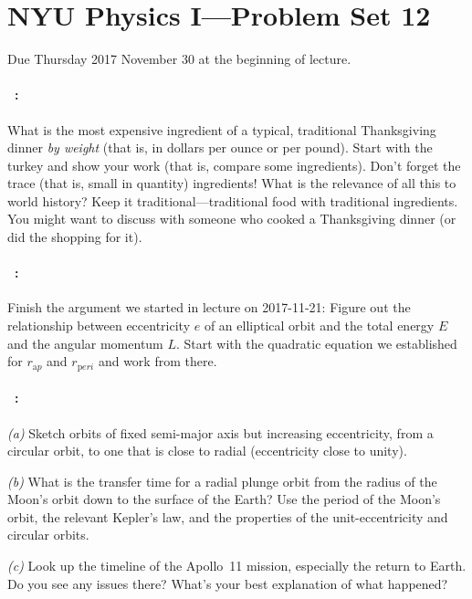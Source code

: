 \documentclass[12pt]{article}
\begin{document}
\section*{NYU Physics I---Problem Set 12}

Due Thursday 2017 November 30 at the beginning of lecture.

\paragraph{\problemname~\theproblem:}%
What is the most expensive ingredient of a typical, traditional
Thanksgiving dinner \emph{by weight} (that is, in dollars per ounce or
per pound).  Start with the turkey and show your work (that is,
compare some ingredients). Don't forget the trace (that is, small
in quantity) ingredients!
What is the relevance of all this to world
history? Keep it traditional---traditional food with traditional
ingredients. You might want to discuss with someone who cooked
a Thanksgiving dinner (or did the shopping for it).

\paragraph{\problemname~\theproblem:}%
Finish the argument we started in lecture on 2017-11-21: Figure out
the relationship between eccentricity $e$ of an elliptical orbit and
the total energy $E$ and the angular momentum $L$. Start with the
quadratic equation we established for $r_{\mathrm ap}$ and $r_{\mathrm
  peri}$ and work from there.

\paragraph{\problemname~\theproblem:}%
\textsl{(a)}
Sketch orbits of fixed semi-major axis but increasing
eccentricity, from a circular orbit, to one that is close to radial
(eccentricity close to unity).

\textsl{(b)}
What is the transfer time for a radial plunge orbit
from the radius of the Moon's orbit down to the surface of the Earth?
Use the period of the Moon's orbit, the relevant  Kepler's law, and
the properties of the unit-eccentricity and circular orbits.

\textsl{(c)}
Look up the timeline of the Apollo~11 mission, especially
the return to Earth.  Do you see any issues there? What's your best
explanation of what happened?
\end{document}
